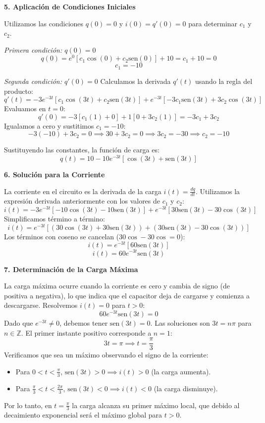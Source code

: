 \documentclass[a4paper]{article}
\begin{document}
\textbf{5. Aplicación de Condiciones Iniciales}

Utilizamos las condiciones $q(0) = 0$ y $i(0) = q'(0) = 0$ para determinar $c_1$ y $c_2$.

\textit{Primera condición: $q(0) = 0$}
$$
q(0) = e^{0} [c_1 \cos(0) + c_2 \text{sen}(0)] + 10 = c_1 + 10 = 0
$$
$$
c_1 = -10
$$

\textit{Segunda condición: $q'(0) = 0$}
Calculamos la derivada $q'(t)$ usando la regla del producto:
$$
q'(t) = -3e^{-3t} [c_1 \cos(3t) + c_2 \text{sen}(3t)] + e^{-3t} [-3c_1 \text{sen}(3t) + 3c_2 \cos(3t)]
$$
Evaluamos en $t = 0$:
$$
q'(0) = -3 [c_1(1) + 0] + 1 [0 + 3c_2(1)] = -3c_1 + 3c_2
$$
Igualamos a cero y sustitimos $c_1 = -10$:
$$
-3(-10) + 3c_2 = 0 \implies 30 + 3c_2 = 0 \implies 3c_2 = -30 \implies c_2 = -10
$$

Sustituyendo las constantes, la función de carga es:
$$
q(t) = 10 - 10e^{-3t} [\cos(3t) + \text{sen}(3t)]
$$

\textbf{6. Solución para la Corriente}

La corriente en el circuito es la derivada de la carga $i(t) = \frac{dq}{dt}$. Utilizamos la expresión derivada anteriormente con los valores de $c_1$ y $c_2$:
$$
i(t) = -3e^{-3t} [-10 \cos(3t) - 10 \text{sen}(3t)] + e^{-3t} [30 \text{sen}(3t) - 30 \cos(3t)]
$$
Simplificamos término a término:
$$
i(t) = e^{-3t} [ (30 \cos(3t) + 30 \text{sen}(3t)) + (30 \text{sen}(3t) - 30 \cos(3t)) ]
$$
Los términos con coseno se cancelan ($30 \cos - 30 \cos = 0$):
$$
i(t) = e^{-3t} [ 60 \text{sen}(3t) ]
$$
$$
i(t) = 60 e^{-3t} \text{sen}(3t)
$$

\textbf{7. Determinación de la Carga Máxima}

La carga máxima ocurre cuando la corriente es cero y cambia de signo (de positiva a negativa), lo que indica que el capacitor deja de cargarse y comienza a descargarse. Resolvemos $i(t) = 0$ para $t > 0$:
$$
60 e^{-3t} \text{sen}(3t) = 0
$$
Dado que $e^{-3t} \neq 0$, debemos tener $\text{sen}(3t) = 0$. Las soluciones son $3t = n\pi$ para $n \in \mathbb{Z}$.
El primer instante positivo corresponde a $n = 1$:
$$
3t = \pi \implies t = \frac{\pi}{3}
$$
Verificamos que sea un máximo observando el signo de la corriente:
\begin{itemize}
    \item Para $0 < t < \frac{\pi}{3}$, $\text{sen}(3t) > 0 \implies i(t) > 0$ (la carga aumenta).
    \item Para $\frac{\pi}{3} < t < \frac{2\pi}{3}$, $\text{sen}(3t) < 0 \implies i(t) < 0$ (la carga disminuye).
\end{itemize}
Por lo tanto, en $t = \frac{\pi}{3}$ la carga alcanza su primer máximo local, que debido al decaimiento exponencial será el máximo global para $t > 0$.
\end{document}
